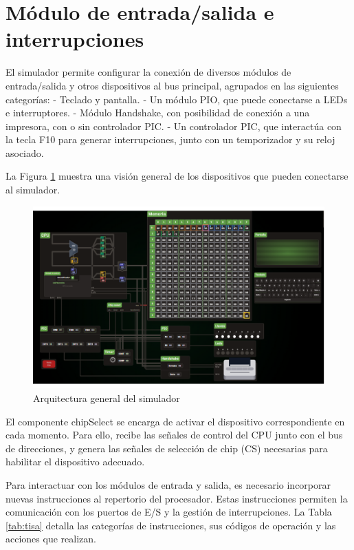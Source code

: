 \documentclass[12pt,oneside]{templates/unerthesis}
\begin{document}
\hypertarget{muxf3dulo-de-entradasalida-e-interrupciones}{%
\section{Módulo de entrada/salida e interrupciones}\label{muxf3dulo-de-entradasalida-e-interrupciones}}

El simulador permite configurar la conexión de diversos módulos de entrada/salida y otros dispositivos al bus principal, agrupados en las siguientes categorías:
- Teclado y pantalla.
- Un módulo PIO, que puede conectarse a LEDs e interruptores.
- Módulo Handshake, con posibilidad de conexión a una impresora, con o sin controlador PIC.
- Un controlador PIC, que interactúa con la tecla F10 para generar interrupciones, junto con un temporizador y su reloj asociado.

La Figura \ref{fig:dispositivos} muestra una visión general de los dispositivos que pueden conectarse al simulador.

\begin{figure}

{\centering \includegraphics[width=0.85\linewidth]{images/esquemavonsim8} 

}

\caption{Arquitectura general del simulador}\label{fig:dispositivos}
\end{figure}

El componente chipSelect se encarga de activar el dispositivo correspondiente en cada momento. Para ello, recibe las señales de control del CPU junto con el bus de direcciones, y genera las señales de selección de chip (CS) necesarias para habilitar el dispositivo adecuado.

Para interactuar con los módulos de entrada y salida, es necesario incorporar nuevas instrucciones al repertorio del procesador. Estas instrucciones permiten la comunicación con los puertos de E/S y la gestión de interrupciones. La Tabla \ref{tab:tisa} detalla las categorías de instrucciones, sus códigos de operación y las acciones que realizan.
\end{document}

